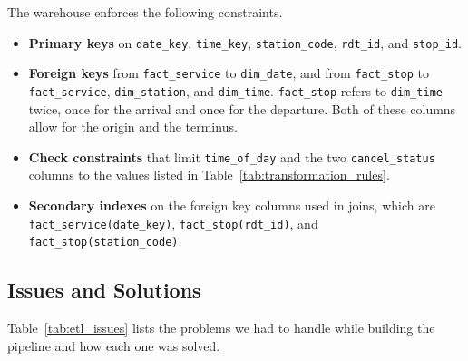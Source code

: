 The warehouse enforces the following constraints.
\begin{itemize}
    \item \textbf{Primary keys} on \texttt{date\_key}, \texttt{time\_key}, \texttt{station\_code}, \texttt{rdt\_id}, and \texttt{stop\_id}.
    \item \textbf{Foreign keys} from \texttt{fact\_service} to \texttt{dim\_date}, and from \texttt{fact\_stop} to \texttt{fact\_service}, \texttt{dim\_station}, and \texttt{dim\_time}. \texttt{fact\_stop} refers to \texttt{dim\_time} twice, once for the arrival and once for the departure. Both of these columns allow  for the origin and the terminus.
    \item \textbf{Check constraints} that limit \texttt{time\_of\_day} and the two \texttt{cancel\_status} columns to the values listed in Table~\ref{tab:transformation_rules}.
    \item \textbf{Secondary indexes} on the foreign key columns used in joins, which are \texttt{fact\_service(date\_key)}, \texttt{fact\_stop(rdt\_id)}, and \texttt{fact\_stop(station\_code)}.
\end{itemize}

\subsection{Issues and Solutions}
\label{subsec:etl_issues}

Table~\ref{tab:etl_issues} lists the problems we had to handle while building the pipeline and how each one was solved.

